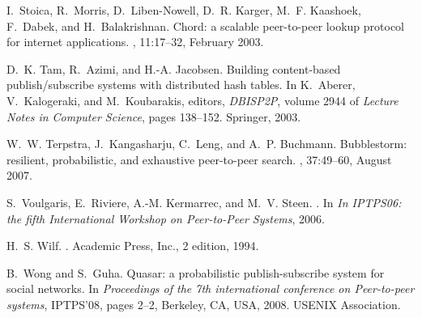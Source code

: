 \documentclass[10pt, conference, compsocconf]{IEEEtran}
\begin{document}
\begin{thebibliography}{10}
I.~Stoica, R.~Morris, D.~Liben-Nowell, D.~R. Karger, M.~F. Kaashoek, F.~Dabek,
  and H.~Balakrishnan.
\newblock Chord: a scalable peer-to-peer lookup protocol for internet
  applications.
, 11:17--32, February 2003.

D.~K. Tam, R.~Azimi, and H.-A. Jacobsen.
\newblock Building content-based publish/subscribe systems with distributed
  hash tables.
\newblock In K.~Aberer, V.~Kalogeraki, and M.~Koubarakis, editors, {\em
  DBISP2P}, volume 2944 of {\em Lecture Notes in Computer Science}, pages
  138--152. Springer, 2003.

W.~W. Terpstra, J.~Kangasharju, C.~Leng, and A.~P. Buchmann.
\newblock Bubblestorm: resilient, probabilistic, and exhaustive peer-to-peer
  search.
, 37:49--60, August 2007.

S.~Voulgaris, E.~Riviere, A.-M. Kermarrec, and M.~V. Steen.
.
\newblock In {\em In IPTPS06: the fifth International Workshop on Peer-to-Peer
  Systems}, 2006.

H.~S. Wilf.
.
\newblock Academic Press, Inc., 2 edition, 1994.

B.~Wong and S.~Guha.
\newblock Quasar: a probabilistic publish-subscribe system for social networks.
\newblock In {\em Proceedings of the 7th international conference on
  Peer-to-peer systems}, IPTPS'08, pages 2--2, Berkeley, CA, USA, 2008. USENIX
  Association.

\end{thebibliography}
\end{document}
